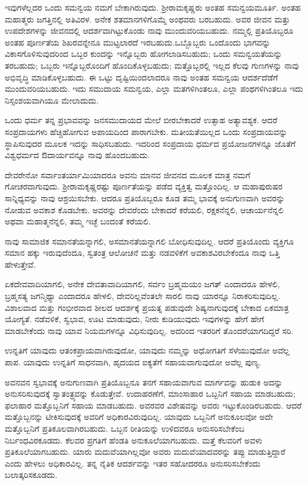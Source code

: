 ಇವುಗಳೆಲ್ಲದರ ಒಂದು ಸಮನ್ವಯ ನಮಗೆ ಬೇಕಾಗಿರುವುದು. ಶ‍್ರೀರಾಮಕೃಷ್ಣರು ಅಂತಹ ಸಮನ್ವಯಮೂರ್ತಿ. ಅಂತಹ ಮಹಾತ್ಮರು ಜಗತ್ತಿನಲ್ಲಿ ಅತಿವಿರಳ. ಅನೇಕ ಶತಮಾನಗಳಿಗೊಮ್ಮೆ ಅಂಥವರು ಬರಬಹುದು. ಅವರ ಜೀವನ ಮತ್ತು ಉಪದೇಶಗಳನ್ನು ಜೀವನದಲ್ಲಿ ಆದರ್ಶವಾಗಿಟ್ಟುಕೊಂಡು ನಾವು ಮುಂದುವರಿಯಬಹುದು. ನಮ್ಮಲ್ಲಿ ಪ್ರತಿಯೊಬ್ಬರೂ ಅಂತಹ ಪೂರ್ಣತೆಯ ಶಿಖರವನ್ನೇನೂ ಮುಟ್ಟಲಾರದೆ ಇರಬಹುದು.\break ಒಬ್ಬೊಬ್ಬರು ಒಂದೊಂದು ಭಾಗವನ್ನು ವಿಕಾಸಗೊಳಿಸುವುದರಿಂದ ಒಬ್ಬರ ಕುಂದನ್ನು ಇನ್ನೊಬ್ಬರು ಹೋಗಲಾಡಿಸಬಹುದು; ಒಂದು ಸಮನ್ವಯತೆಯನ್ನು ತರಬಹುದು; ಒಬ್ಬರು ಇನ್ನೊಬ್ಬರೊಂದಿಗೆ ಹೊಂದಿಕೊಳ್ಳಬಹುದು; ಮತ್ತೊಬ್ಬರಲ್ಲಿ ಇಲ್ಲದ ಕೆಲವು ಗುಣಗಳನ್ನು ನಾವು ಅಭಿವೃದ್ಧಿ ಮಾಡಿಕೊಳ್ಳಬಹುದು. ಈ ಒಟ್ಟು ದೃಷ್ಟಿಯಿಂದಲಾದರೂ ನಾವು ಅಂತಹ ಸಮನ್ವಯ ಆದರ್ಶದೆಡೆಗೆ ಮುಂದುವರಿಯಬಹುದು. ಇದು ಸಮುದಾಯ ಸಮನ್ವಯ, ಎಲ್ಲಾ ಮತಗಳಿಗಿಂತಲೂ, ಎಲ್ಲಾ ಪಂಥಗಳಿಗಿಂತಲೂ ಇದು ನಿಸ್ಸಂಶಯವಾಗಿಯೂ ಮೇಲಾದುದು.

ಒಂದು ಧರ್ಮ ತನ್ನ ಪ್ರಭಾವವನ್ನು ಜನಸಮುದಾಯದ ಮೇಲೆ ಬೀರಬೇಕಾದರೆ ಉತ್ಸಾಹ ಅತ್ಯಾವಶ್ಯಕ. ಆದರೆ ಸಂಪ್ರದಾಯಗಳು ಹೆಚ್ಚಿಹೋಗುವ ಅಪಾಯದಿಂದ ಪಾರಾಗಬೇಕು. ಮತೀಯತೆಯಿಲ್ಲದ ಒಂದು ಸಂಪ್ರದಾಯವನ್ನು ಸ್ಥಾಪಿಸುವುದರ ಮೂಲಕ ಇದನ್ನು ಸಾಧಿಸಬಹುದು. ಇದರಿಂದ ಸಂಪ್ರದಾಯ ಧರ್ಮದ ಪ್ರಯೋಜನಗಳನ್ನೂ ಜೊತೆಗೆ ವಿಶ್ವಧರ್ಮದ ಔದಾರ್ಯವನ್ನೂ ನಾವು ಹೊಂದಬಹುದು.

ದೇವರೇನೋ ಸರ್ವಾಂತರ್ಯಾಮಿಯಾದರೂ ಅವನು ಮಾನವ ಜೀವನದ ಮೂಲಕ ಮಾತ್ರ ನಮಗೆ ಗೋಚರವಾಗುವುದು. ಶ‍್ರೀರಾಮಕೃಷ್ಣರಷ್ಟು ಪೂರ್ಣತೆಯನ್ನು ಪಡೆದ ವ್ಯಕ್ತಿತ್ವ ಮತ್ತೊಂದಿಲ್ಲ. ಆ ಮಹಾಪುರುಷರ ಸಾನ್ನಿಧ್ಯವನ್ನು ನಾವು ಆಶ್ರಯಿಸಬೇಕು. ಆದರೂ ಪ್ರತಿಯೊಬ್ಬರೂ ಕೂಡ ತಮ್ಮ ಭಾವಕ್ಕೆ ಅನುಗುಣವಾಗಿ ಅವರನ್ನು ನೋಡುವ ಅವಕಾಶ ಕೊಡಬೇಕು. ಅವರನ್ನು ದೇವರೆಂದು ಬೇಕಾದರೆ ಕರೆಯಲಿ, ರಕ್ಷಕನೆನ್ನಲಿ, ಆಚಾರ್ಯನೆನ್ನಲಿ ಅಥವಾ ಮಹಾತ್ಮನೆನ್ನಲಿ, ತಮ್ಮ ಇಚ್ಛೆ ಬಂದಂತೆ ಕರೆಯಲಿ.

ನಾವು ಸಾಮಾಜಿಕ ಸಮಾನತೆಯನ್ನಾಗಲಿ, ಅಸಮಾನತೆಯನ್ನಾಗಲಿ ಬೋಧಿಸುವುದಿಲ್ಲ. ಆದರೆ ಪ್ರತಿಯೊಂದು ವ್ಯಕ್ತಿಗೂ ಸಮಾನ ಹಕ್ಕು ಇರುವುದೆಂದೂ, ಸ್ವತಂತ್ರ ಆಲೋಚನೆ ಮತ್ತು ನಡವಳಿಕೆಗೆ ಅವಕಾಶವಿರಬೇಕೆಂದೂ ನಾವು ಒತ್ತಿ ಹೇಳುತ್ತೇವೆ.

ಏಕದೇವವಾದಿಯಾಗಲಿ, ಅನೇಕ ದೇವತಾವಾದಿಯಾಗಲಿ, ಸರ್ವಂ ಬ್ರಹ್ಮಮಯಂ ಜಗತ್ ಎಂದಾದರೂ ಹೇಳಲಿ, ಬ್ರಹ್ಮಸತ್ಯ ಜಗನ್ಮಿಥ್ಯಾ ಎಂದಾದರೂ ಹೇಳಲಿ, ದೇವರಿಲ್ಲವೆಂತಲೇ ಸಾರಲಿ \enginline{-} ನಾವು ಯಾರನ್ನೂ ನಿರಾಕರಿಸುವುದಿಲ್ಲ. ವಿಶಾಲವಾದ ಮತ್ತು ಗಂಭೀರವಾದ ಶೀಲದ ಆದರ್ಶಕ್ಕೆ ಪ್ರಯತ್ನ ಪಡುವುದೇ ಶಿಷ್ಯನಾಗುವುದಕ್ಕೆ ಬೇಕಾದ ಏಕಮಾತ್ರ ಯೋಗ್ಯತೆ. ನಡೆವಳಿಕೆ, ಸ್ವಭಾವ, ಊಟ ಮಾಡುವುದು, ನೀರು ಕುಡಿಯುವುದು ಇವುಗಳನ್ನು ಹೇಗೆ ಹೇಗೆ ಮಾಡಬೇಕೆಂದು ನಾವು ಯಾವ ನಿಯಮಗಳನ್ನೂ ವಿಧಿಸುವುದಿಲ್ಲ. ಅದರಿಂದ ಇತರರಿಗೆ ತೊಂದರೆಯಾಗದಿದ್ದರೆ ಸರಿ.

ಉನ್ನತಿಗೆ ಯಾವುದು ಆತಂಕಪ್ರಾಯವಾಗಿರುವುದೋ, ಯಾವುದು ನಮ್ಮನ್ನು ಅಧೋಗತಿಗೆ ಸೆಳೆಯುವುದೋ ಅವೆಲ್ಲ ಪಾಪ. ಯಾವುದು ಉನ್ನತಿಗೆ ಸಾಧನವಾಗಿ, ಹೃದಯದ ಐಕ್ಯತೆಗೆ ಸಹಾಯವಾಗುವುದೋ ಅವೆಲ್ಲ ಪುಣ್ಯ.

\vspace{0.2cm}

ಅವನವನ ಸ್ವಭಾವಕ್ಕೆ ಅನುಗುಣವಾಗಿ ಪ್ರತಿಯೊಬ್ಬನೂ ತನಗೆ ಸಹಾಯವಾಗುವ ಮಾರ್ಗವನ್ನು ಹುಡುಕಿ ಅದನ್ನು ಅನುಸರಿಸುವುದಕ್ಕೆ ಸ್ವಾತಂತ್ರ್ಯವನ್ನು ಕೊಡುತ್ತೇವೆ. ಉದಾ\break ಹರಣೆಗೆ, ಮಾಂಸಾಹಾರ ಒಬ್ಬನಿಗೆ ಸಹಾಯ ಮಾಡಬಹುದು; ಫಲಾಹಾರ ಮತ್ತೊಬ್ಬನಿಗೆ ಸಹಾಯ ಮಾಡಬಹುದು. ಅವರವರ ವಿಶೇಷವನ್ನು ಅವರು ಇಟ್ಟುಕೊಂಡಿರಬಹುದು. ಆದರೆ ಮತ್ತೊಬ್ಬನನ್ನು ಟೀಕಿಸುವುದಕ್ಕೆ ಅವರಿಗೆ ಅಧಿಕಾರವಿರುವುದಿಲ್ಲ. ಯಾವುದು ಒಬ್ಬನಿಗೆ ಅನುಕೂಲವೋ ಅದೇ ಮತ್ತೊಬ್ಬನಿಗೆ ಪ್ರತಿಕೂಲವಾಗಿರಬಹುದು. ಒಬ್ಬನ ರೀತಿಯನ್ನು ಉಳಿದವರೂ ಅನುಸರಿಸಬೇಕೆಂಬ ನಿರ್ಬಂಧವಿರಕೂಡದು. ಕೆಲವರ ಪ್ರಗತಿಗೆ ಹೆಂಡತಿ ಅನುಕೂಲೆಯಾಗಬಹುದು. ಮತ್ತೆ ಕೆಲವರಿಗೆ ಅವಳು ಪ್ರತಿಕೂಲೆಯಾಗಬಹುದು. ಯಾರು ಮದುವೆಯಾಗಿಲ್ಲವೋ ಅವರು ಮದುವೆಯಾದವರನ್ನು ತಪ್ಪು ಮಾಡುತ್ತಿದ್ದಾರೆ ಎಂದು ಹೇಳಲು ಅಧಿಕಾರವಿಲ್ಲ. ತನ್ನ ನೈತಿಕ ಆದರ್ಶವನ್ನು ಇತರ ಸಹೋದರರೂ ಅನುಸರಿಸಬೇಕೆಂದು ಬಲಾತ್ಕರಿಸಕೂಡದು.

